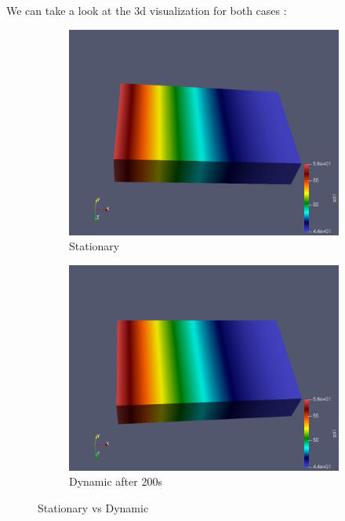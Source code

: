 \documentclass{article}
\begin{document}
We can take a look at the 3d visualization for both cases :

\begin{figure}[H]
\begin{subfigure}{.5\textwidth}
  \centering
  \includegraphics[width=1\linewidth]{images/static_3d.png}
  \caption{Stationary}
  \label{fig:sfig1}
\end{subfigure}
\begin{subfigure}{.5\textwidth}
  \centering
  \includegraphics[width=1\linewidth]{images/dyna_200s.png}
  \caption{Dynamic after 200s}
\end{subfigure}
\caption{Stationary vs Dynamic}
\label{fig:fig}
\end{figure}
\end{document}
